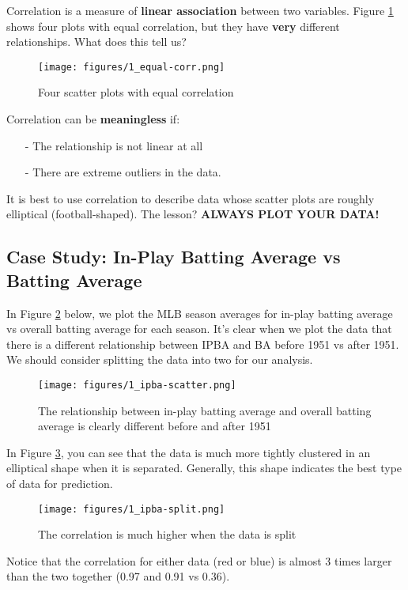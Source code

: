 \documentclass[twoside]{article}
\theoremstyle{definition}
\begin{document}
Correlation is a measure of \textbf{linear association} between two variables. Figure \ref{fig:equal-corr} shows four plots with equal correlation, but they have \textbf{very} different relationships. What does this tell us?
\begin{figure}[h]
    \centering
    \texttt{[image: figures/1\_equal-corr.png]}
    \caption{Four scatter plots with equal correlation}
    \label{fig:equal-corr}
\end{figure}

Correlation can be \textbf{meaningless} if:
\begin{itemize}
    \item[-] The relationship is not linear at all
    \item[-] There are extreme outliers in the data.
\end{itemize}
It is best to use correlation to describe data whose scatter plots are roughly elliptical (football-shaped). The lesson? \textbf{ALWAYS PLOT YOUR DATA!}

\subsection{Case Study: In-Play Batting Average vs Batting Average}

In Figure \ref{fig:ipba-scatter} below, we plot the MLB season averages for in-play batting average vs overall batting average for each season. It's clear when we plot the data that there is a different relationship between IPBA and BA before 1951 vs after 1951. We should consider splitting the data into two for our analysis.
\begin{figure}[H]
    \centering
    \texttt{[image: figures/1\_ipba-scatter.png]}
    \caption{The relationship between in-play batting average and overall batting average is clearly different before and after 1951}
    \label{fig:ipba-scatter}
\end{figure}

In Figure \ref{fig:ipba-split}, you can see that the data is much more tightly clustered in an elliptical shape when it is separated. Generally, this shape indicates the best type of data for prediction.
\begin{figure}[H]
    \centering
    \texttt{[image: figures/1\_ipba-split.png]}
    \caption{The correlation is much higher when the data is split}
    \label{fig:ipba-split}
\end{figure}
Notice that the correlation for either data (red or blue) is almost 3 times larger than the two together (0.97 and 0.91 vs 0.36).
\end{document}
